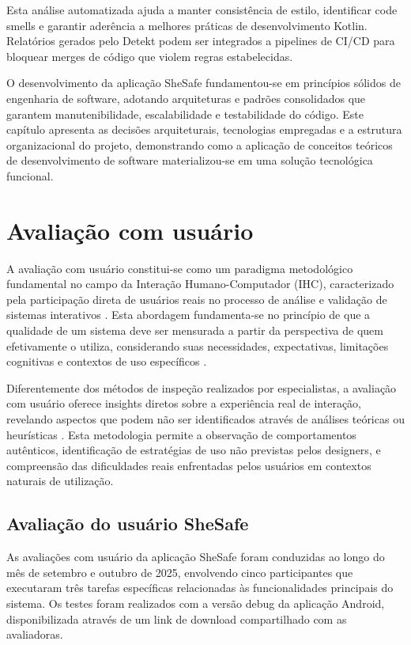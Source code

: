 Esta análise automatizada ajuda a manter consistência de estilo, identificar code smells e garantir aderência a melhores práticas de desenvolvimento Kotlin. Relatórios gerados pelo Detekt podem ser integrados a pipelines de CI/CD para bloquear merges de código que violem regras estabelecidas.

O desenvolvimento da aplicação SheSafe fundamentou-se em princípios sólidos de engenharia de software, adotando arquiteturas e padrões consolidados que garantem manutenibilidade, escalabilidade e testabilidade do código. Este capítulo apresenta as decisões arquiteturais, tecnologias empregadas e a estrutura organizacional do projeto, demonstrando como a aplicação de conceitos teóricos de desenvolvimento de software materializou-se em uma solução tecnológica funcional.

\section{Avaliação com usuário}
A avaliação com usuário constitui-se como um paradigma metodológico fundamental no campo da Interação Humano-Computador (IHC), caracterizado pela participação direta de usuários reais no processo de análise e validação de sistemas interativos \cite{dix2003human}. Esta abordagem fundamenta-se no princípio de que a qualidade de um sistema deve ser mensurada a partir da perspectiva de quem efetivamente o utiliza, considerando suas necessidades, expectativas, limitações cognitivas e contextos de uso específicos \cite{preece2015interaction}.

Diferentemente dos métodos de inspeção realizados por especialistas, a avaliação com usuário oferece insights diretos sobre a experiência real de interação, revelando aspectos que podem não ser identificados através de análises teóricas ou heurísticas \cite{nielsen1994usability}. Esta metodologia permite a observação de comportamentos autênticos, identificação de estratégias de uso não previstas pelos designers, e compreensão das dificuldades reais enfrentadas pelos usuários em contextos naturais de utilização.
\subsection{Avaliação do usuário SheSafe}

As avaliações com usuário da aplicação SheSafe foram conduzidas ao longo do mês de setembro e outubro de 2025, envolvendo cinco participantes que executaram três tarefas específicas relacionadas às funcionalidades principais do sistema. Os testes foram realizados com a versão debug da aplicação Android, disponibilizada através de um link de download compartilhado com as avaliadoras.

